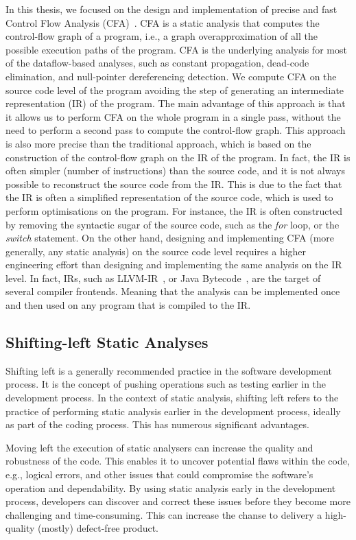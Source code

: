 In this thesis, we focused on the design and implementation of precise and fast
Control Flow Analysis (CFA)~\cite{spa}.  CFA is a static analysis that computes
the control-flow graph of a program, i.e., a graph overapproximation of all the possible
execution paths of the program. CFA is the underlying analysis for most of the dataflow-based analyses, such as
constant propagation, dead-code elimination, and null-pointer dereferencing detection.
We compute CFA on the source code level of the program avoiding the step of
generating an intermediate representation (IR) of the program. The 
main advantage of this approach is that it allows us to perform CFA on the whole program
in a single pass, without the need to perform a second pass to compute the control-flow graph.
This approach is also more precise than the traditional approach, which is based on the
construction of the control-flow graph on the IR of the program. In fact, the IR is often
simpler (number of instructions) than the source code, and it is not always possible to reconstruct the source code
from the IR. This is due to the fact that the IR is often a simplified representation of the source code,
which is used to perform optimisations on the program. For instance, the IR is often
constructed by removing the syntactic sugar of the source code, such as the \emph{for} loop, 
or the \emph{switch} statement.
On the other hand, designing and implementing CFA (more generally, any static analysis) on the source code level
requires a higher engineering effort than designing and implementing the same analysis on the IR level.
In fact, IRs, such as LLVM-IR~\cite{LLVM}, or Java Bytecode~\cite{javaBytecode}, are 
the target of several compiler frontends. Meaning that the analysis can be implemented once
and then used on any program that is compiled to the IR.




\subsection{Shifting-left Static Analyses}
Shifting left is a generally recommended practice in the software development process.
It is the concept of pushing operations such as testing earlier in the development process.
In the context of static analysis, shifting left refers to the practice of performing
static analysis earlier in the development process, ideally as part of the coding process.
This has numerous significant advantages.


Moving left the execution of static analysers can increase the quality and robustness of the code. 
This enables it to uncover potential flaws within the code, e.g., logical errors,
and other issues that could compromise the software's operation and
dependability. By using static analysis early in the development process, developers
can discover and correct these issues before they become more challenging and time-consuming.
This can increase the chanse to delivery a high-quality (mostly) defect-free product.

